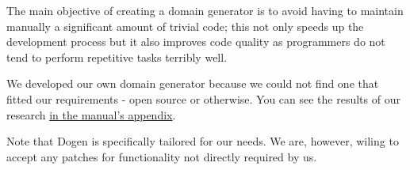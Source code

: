 \documentclass[11pt]{article}
\begin{document}
The main objective of creating a domain generator is to avoid having
to maintain manually a significant amount of trivial code; this not
only speeds up the development process but it also improves code
quality as programmers do not tend to perform repetitive tasks
terribly well.

We developed our own domain generator because we could not find one
that fitted our requirements - open source or otherwise. You can see
the results of our research \href{https://github.com/kitanda/dogen/blob/master/doc/manual/manual.org#appendix-a---related-work}{in the manual's appendix}.

Note that Dogen is specifically tailored for our needs. We are,
however, wiling to accept any patches for functionality not directly
required by us.
\end{document}
